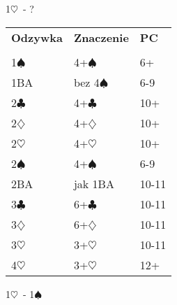 \documentclass{article}
\renewcommand{\c}{\(\clubsuit\)}
\renewcommand{\d}{\(\diamondsuit\)}
\newcommand{\h}{\(\heartsuit\)}
\newcommand{\s}{\(\spadesuit\)}
\begin{document}
\newpage
\begin{center}\LARGE{1\h\ - ?}\end{center}

\begin{tabular}{p{2cm} p{10cm} l}
	\textbf{Odzywka} & \textbf{Znaczenie} & \textbf{PC}\\\\
	1\s & 4+\s & 6+ \\
	1BA & bez 4\s & 6-9 \\
	2\c & 4+\c & 10+ \\
	2\d & 4+\d & 10+ \\
	2\h & 4+\h & 10+ \\
	2\s & 4+\s & 6-9 \\
	2BA & jak 1BA & 10-11 \\
	3\c & 6+\c & 10-11 \\
	3\d & 6+\d & 10-11 \\
	3\h & 3+\h & 10-11 \\
	4\h & 3+\h & 12+ \\
\end{tabular}
\begin{center}\LARGE{1\h\ - 1\s}
\end{center}
\end{document}
